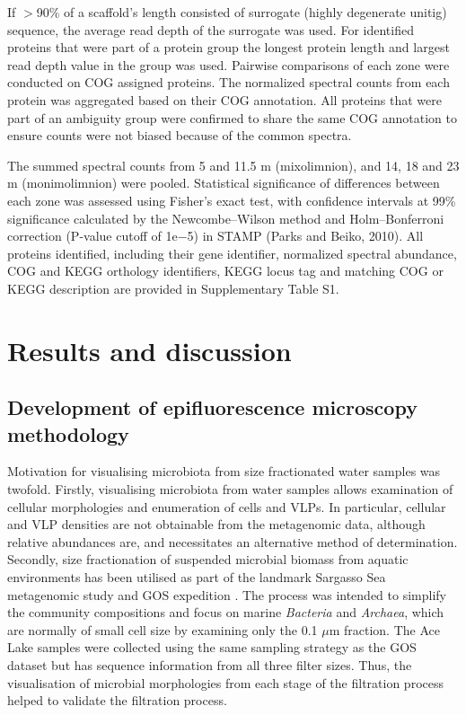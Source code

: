 If $>$90\% of a scaffold’s length consisted of surrogate (highly degenerate unitig) sequence, the average read depth of the surrogate was used. 
For identified proteins that were part of a protein group the longest protein length and largest read depth value in the group was used. 
Pairwise comparisons of each zone were conducted on COG assigned proteins. 
The normalized spectral counts from each protein was aggregated based on their COG annotation. 
All proteins that were part of an ambiguity group were confirmed to share the same COG annotation to ensure counts were not biased because of the common spectra.

The summed spectral counts from 5 and 11.5 m (mixolimnion), and 14, 18 and 23 m (monimolimnion) were pooled. 
Statistical significance of differences between each zone was assessed using Fisher’s exact test, with confidence intervals at 99\% significance calculated by the Newcombe–Wilson method and Holm–Bonferroni correction (P-value cutoff of 1e$-$5) in \ac{STAMP} (Parks and Beiko, 2010). 
All proteins identified, including their gene identifier, normalized spectral abundance, \ac{COG} and \ac{KEGG} orthology identifiers, \ac{KEGG} locus tag and matching \ac{COG} or \ac{KEGG} description are provided in Supplementary Table S1.




\section{Results and discussion}

\subsection[Epifluorescence microscopy methodology]{Development of epifluorescence microscopy methodology}
Motivation for visualising microbiota from size fractionated water samples was twofold. 
Firstly, visualising microbiota from water samples allows examination of cellular morphologies and enumeration of cells and \acp{VLP}.
In particular, cellular and \ac{VLP} densities are not obtainable from the metagenomic data, although relative abundances are, and necessitates an alternative method of determination.
Secondly, size fractionation of suspended microbial biomass from aquatic environments has been utilised as part of the landmark Sargasso Sea metagenomic study \cite{Venter2004} and \ac{GOS} expedition \cite{Rusch2007}.
The process was intended to simplify the community compositions and focus on marine \emph{Bacteria} and \emph{Archaea}, which are normally of small cell size by examining only the 0.1 $\mu$m fraction.
The Ace Lake samples were collected using the same sampling strategy as the \ac{GOS} dataset but has sequence information from all three filter sizes. 
Thus, the visualisation of microbial morphologies from each stage of the filtration process helped to validate the filtration process.

